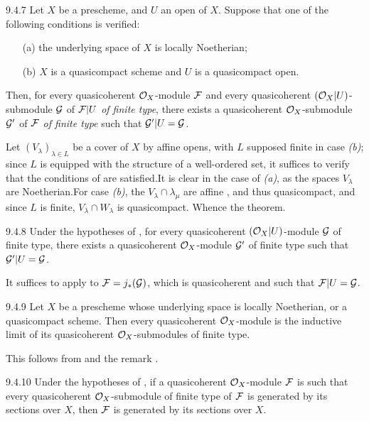 \begin{env}[Theorem]{9.4.7}
\label{lem-1.9.4.7}
Let $X$ be a prescheme, and $U$ an open of $X$.
Suppose that one of the following conditions is verified:
\begin{itemize}
  \item[(a)] the underlying space of $X$ is locally Noetherian;
  \item[(b)] $X$ is a quasicompact scheme and $U$ is a quasicompact open.
\end{itemize}
Then, for every quasicoherent $\mathcal{O}_X$-module $\mathcal{F}$ and every quasicoherent
$(\mathcal{O}_X|U)$-submodule $\mathcal{G}$ of $\mathcal{F}|U$ \emph{of finite type}, there exists a
quasicoherent $\mathcal{O}_X$-submodule $\mathcal{G}'$ of $\mathcal{F}$ \emph{of finite type}
such that $\mathcal{G}'|U=\mathcal{G}$.
\end{env}

Let $(V_\lambda)_{\lambda\in L}$ be a cover of $X$ by affine opens,
with $L$ supposed finite in case \emph{(b)}; since $L$ is equipped with the
structure of a well-ordered set, it suffices to verify that the conditions of
 are satisfied.It is clear in the case of \emph{(a)}, as the spaces
$V_\lambda$ are Noetherian.For case \emph{(b)}, the $V_\lambda\cap\lambda_\mu$
are affine , and thus quasicompact, and since $L$ is finite,
$V_\lambda\cap W_\lambda$ is quasicompact. Whence the theorem.

\begin{env}[Corollary]{9.4.8}
\label{cor-1.9.4.8}
Under the hypotheses of , for every quasicoherent $(\mathcal{O}_X|U)$-module
$\mathcal{G}$ of finite type, there exists a quasicoherent $\mathcal{O}_X$-module $\mathcal{G}'$
of finite type such that $\mathcal{G}'|U=\mathcal{G}$.
\end{env}

It suffices to apply  to $\mathcal{F}=j_\ast(\mathcal{G})$, which is
quasicoherent  and such that $\mathcal{F}|U=\mathcal{G}$.

\begin{env}[Corollary]{9.4.9}
\label{cor-1.9.4.9}
Let $X$ be a prescheme whose underlying space is locally Noetherian, or a
quasicompact scheme. Then every quasicoherent $\mathcal{O}_X$-module is the inductive limit
of its quasicoherent $\mathcal{O}_X$-submodules of finite type.
\end{env}

This follows from  and the remark .

\begin{env}[Corollary]{9.4.10}
\label{cor-1.9.4.10}
Under the hypotheses of , if a quasicoherent $\mathcal{O}_X$-module $\mathcal{F}$
is such that every quasicoherent $\mathcal{O}_X$-submodule of finite type of $\mathcal{F}$ is
generated by its sections over $X$, then $\mathcal{F}$ is generated by its sections
over $X$.
\end{env}

